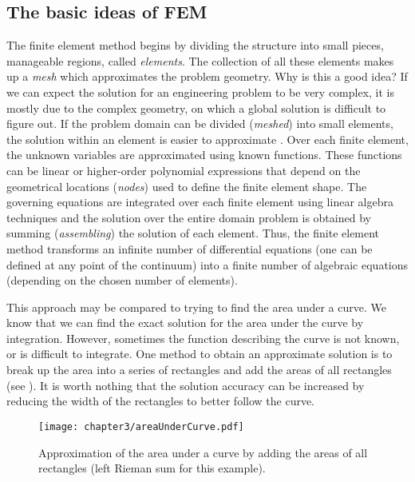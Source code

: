 	\subsection{The basic ideas of FEM}
The finite element method begins by dividing the structure into small pieces, manageable regions, called \emph{elements}. The collection of all these elements makes up a \emph{mesh} which approximates the problem geometry. Why is this a good idea? If we can expect the solution for an engineering problem to be very complex, it is mostly due to the complex geometry, on which a global solution is difficult to figure out. If the problem domain can be divided (\emph{meshed}) into small elements, the solution within an element is easier to approximate \citep{MacDonald07}. Over each finite element, the unknown variables are approximated using known functions. These functions can be linear or higher-order polynomial expressions that depend on the geometrical locations (\emph{nodes}) used to define the finite element shape. The governing equations are integrated over each finite element using linear algebra techniques and the solution over the entire domain problem is obtained by summing (\emph{assembling}) the solution of each element. Thus, the finite element method transforms an infinite number of differential equations (one can be defined at any point of the continuum) into a finite number of algebraic equations (depending on the chosen number of elements). 

This approach may be compared to trying to find the area under a curve. We know that we can find the exact solution for the area under the curve by integration. However, sometimes the function describing the curve is not known, or is difficult to integrate. One method to obtain an approximate solution is to break up the area into a series of rectangles and add the areas of all rectangles (see ). It is worth nothing that the solution accuracy can be increased by reducing the width of the rectangles to better follow the curve. 
%
\begin{figure}[h]
\begin{center}
\texttt{[image: chapter3/areaUnderCurve.pdf]}
\end{center}
\caption[Approximation of the area under a curve]{Approximation of the area under a curve by adding the areas of all rectangles (left Rieman sum for this example).}
\label{chap3:fig-areaUnderCurve}
\end{figure}

